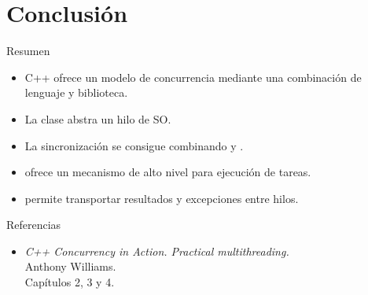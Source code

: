 \section{Conclusión}

\begin{frame}{Resumen}
\begin{itemize}
  \item C++ ofrece un modelo de concurrencia mediante una combinación
        de lenguaje y biblioteca.
  \item La clase  abstra un hilo de SO.
  \item La sincronización se consigue combinando  y .
  \item {} ofrece un mecanismo de alto nivel para ejecución de tareas.
  \item {} permite transportar resultados y excepciones entre hilos.
\end{itemize}
\end{frame}

\begin{frame}[t]{Referencias}
\begin{itemize}
  \item \emph{C++ Concurrency in Action. Practical multithreading.}\\
  Anthony Williams.\\
  Capítulos 2, 3 y 4.
\end{itemize}
\end{frame}
